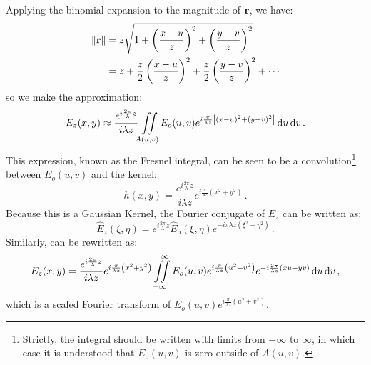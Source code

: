 Applying the binomial expansion to the magnitude of $\mathbf r$, we have:
\begin{align}
\Vert \mathbf r \Vert &= z\sqrt{1 + \left(\frac{x-u}{z}\right)^2 + \left(\frac{y-v}{z}\right)^2}\\
& = z + \frac{z}{2}\left(\frac{x-u}{z}\right)^2+ \frac{z}{2} \left(\frac{y-v}{z}\right)^2 + \cdots
\end{align}
so we make the approximation:
\begin{equation} \label{eq:fresnelint}
E_z(x,y) \approx \frac{e^{i\frac{2\pi}{\lambda}z}}{i\lambda z}  \iint\limits_{A(u,v)} E_o(u,v) e^{i\frac{\pi}{\lambda z}\left[ (x - u)^2 + (y - v)^2\right]} \,\mathrm{d}u\,\mathrm{d}v \,.
\end{equation}
This expression, known as the Fresnel integral, can be seen to be a convolution\footnote{Strictly, the integral should be written with limits from $-\infty$ to $\infty$, in which case it is understood that $E_o(u,v)$ is zero outside of $A(u,v)$.}  between $E_o(u,v)$ and the kernel:
\begin{equation}
h(x,y) = \frac{e^{i\frac{2\pi}{\lambda}z}}{i\lambda z}e^{i\frac{\pi}{\lambda z}\left(x^2 + y^2\right)} \,.
\end{equation}
Because this is a Gaussian Kernel, the Fourier conjugate of $E_z$ can be written as:
\begin{equation}\label{eq:fourierConj}
\hat{E}_z(\xi,\eta) = e^{i\frac{2\pi}{\lambda}z} \hat{E}_o(\xi,\eta)e^{-i\pi \lambda z\left(\xi^2 + \eta^2\right)} \,.
\end{equation}
Similarly,  can be rewritten as:
\begin{equation}\label{eq:fresnelint2}
E_z(x,y) = \frac{e^{i\frac{2\pi}{\lambda}z}}{i\lambda z}e^{i\frac{\pi}{\lambda z}\left(x^2 + y^2\right)} \iint\limits_{-\infty}^{\quad \infty} E_o(u,v)e^{i\frac{\pi}{\lambda z}\left(u^2 + v^2\right)}  e^{-i\frac{2\pi}{\lambda z}\left(xu +yv\right)} \,\mathrm{d}u\,\mathrm{d}v \,,
\end{equation}
which is a scaled Fourier transform of $E_o(u,v)e^{i\frac{\pi}{\lambda z}\left(u^2 + v^2\right)}$.

